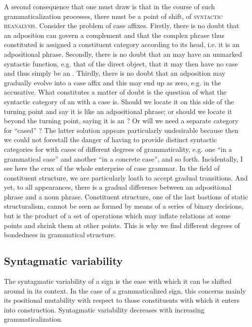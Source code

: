 A second consequence that one must draw is that in the course of such grammaticalization processes, there must be a point of shift, of \textsc{syntactic reanalysis}. Consider the problem of case affixes. Firstly, there is no doubt that an adposition can govern a complement \np and that the complex phrase thus constituted is assigned a constituent category according to its head, i.e. it is an adpositional phrase. Secondly, there is no doubt that an \np may have an unmarked syntactic function, e.g. that of the direct object, that it may then have no case and thus simply be an \np. Thirdly, there is no doubt that an adposition may gradually evolve into a case affix and this may end up as zero, e.g. in the accusative. What constitutes a matter of doubt is the question of what the syntactic category of an \np with a case is. Should we locate it on this side of the turning point and say it is like an adpositional phrase; or should we locate it beyond the turning point, saying it is an \np? Or will we need a separate category for ``cased'' \nps? The latter solution appears particularly undesirable because then we could not forestall the danger of having to provide distinct syntactic categories for \nps with cases of different degrees of grammaticality, e.g. one ``\np in a grammatical case'' and another ``\np in a concrete case'', and so forth. Incidentally, I see here the crux of the whole enterprise of case grammar. In the field of constituent structure, we are particularly loath to accept gradual transitions. And yet, to all appearances, there is a gradual difference between an adpositional phrase and a noun phrase. Constituent structure, one of the last bastions of static structuralism, cannot be seen as formed by means of a series of binary decisions, but is the product of a set of operations which may inflate relations at some points and shrink them at other points. This is why we find different degrees of bondedness in grammatical structure.

\subsection{Syntagmatic variability}

The syntagmatic variability of a sign is the ease with which it can be shifted around in its context. In the case of a grammaticalized sign, this concerns mainly its positional mutability with respect to those constituents with which it enters into construction. Syntagmatic variability decreases with increasing grammaticalization.

